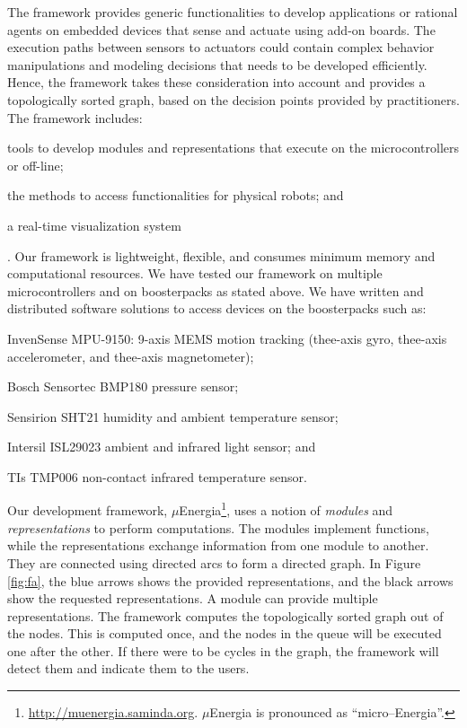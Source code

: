 \documentclass[letterpaper]{article}
\begin{document}
\begin{sloppy}
The framework provides generic functionalities to develop applications or rational agents 
on embedded devices that sense and actuate using add-on boards. The execution paths between sensors 
to actuators could contain complex behavior manipulations and modeling decisions that needs to be 
developed efficiently. Hence, the framework takes these consideration into account and provides a 
topologically sorted graph, based on the decision points provided by practitioners. The framework 
includes: \begin{inparaenum}[1)] \item tools to develop modules and representations that execute on 
the microcontrollers or off-line; \item the methods to access functionalities for physical robots; 
and \item a real-time visualization system\end{inparaenum}. Our framework is lightweight, flexible, 
and consumes minimum memory and computational resources. We have tested our framework on multiple 
microcontrollers and on boosterpacks as stated above. We have written and distributed  software 
solutions to access devices on the boosterpacks such as: \begin{inparaenum}[(1)] \item InvenSense 
MPU-9150: 9-axis MEMS motion tracking (thee-axis gyro, thee-axis accelerometer, and thee-axis 
magnetometer); \item Bosch Sensortec BMP180 pressure sensor; \item Sensirion SHT21 humidity and 
ambient temperature sensor; \item Intersil ISL29023 ambient and infrared light sensor; and \item 
TIs TMP006 non-contact infrared temperature sensor.\end{inparaenum}


Our development framework, $\mu$Energia\footnote{
\url{http://muenergia.saminda.org}. $\mu$Energia is pronounced as ``micro--Energia''. }, uses a 
notion 
of  {\em modules} and {\em representations} to perform computations. The modules implement 
functions, while the representations exchange information from one module to another. They are 
connected using directed arcs to form a directed graph. In Figure \ref{fig:fa}, the blue arrows 
shows the provided representations, and the black arrows show the requested representations. A 
module can provide multiple representations. The framework computes the topologically sorted 
graph out of the nodes. This is computed once, and the nodes in the queue will be executed one 
after the other. If there were to be cycles in the graph, the framework will detect them and 
indicate them to the users. 


\end{sloppy}
\end{document}
